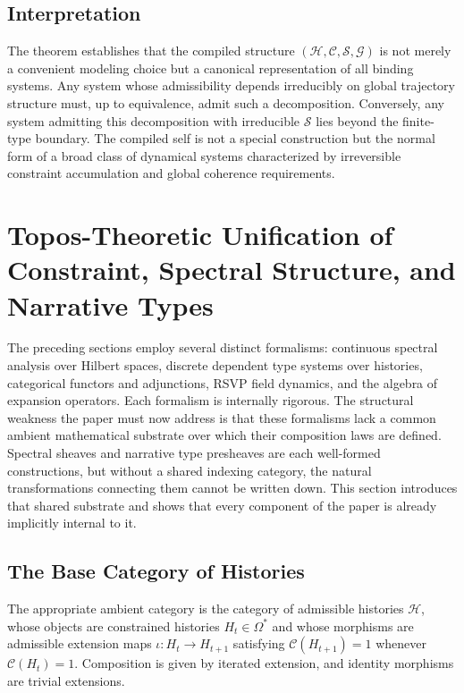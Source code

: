 \documentclass[12pt, a4paper]{article}
\theoremstyle{plain}
\theoremstyle{definition}
\theoremstyle{remark}
\begin{document}
\subsection{Interpretation}

The theorem establishes that the compiled structure $(\mathcal{H}, \mathcal{C}, \mathcal{S}, \mathcal{G})$ is not merely a convenient modeling choice but a canonical representation of all binding systems. Any system whose admissibility depends irreducibly on global trajectory structure must, up to equivalence, admit such a decomposition. Conversely, any system admitting this decomposition with irreducible $\mathcal{S}$ lies beyond the finite-type boundary. The compiled self is not a special construction but the normal form of a broad class of dynamical systems characterized by irreversible constraint accumulation and global coherence requirements.

\section{Topos-Theoretic Unification of Constraint, Spectral Structure, and Narrative Types}

The preceding sections employ several distinct formalisms: continuous spectral analysis over Hilbert spaces, discrete dependent type systems over histories, categorical functors and adjunctions, RSVP field dynamics, and the algebra of expansion operators. Each formalism is internally rigorous. The structural weakness the paper must now address is that these formalisms lack a common ambient mathematical substrate over which their composition laws are defined. Spectral sheaves and narrative type presheaves are each well-formed constructions, but without a shared indexing category, the natural transformations connecting them cannot be written down. This section introduces that shared substrate and shows that every component of the paper is already implicitly internal to it.

\subsection{The Base Category of Histories}

The appropriate ambient category is the category of admissible histories $\mathcal{H}$, whose objects are constrained histories $H_t \in \Omega^*$ and whose morphisms are admissible extension maps $\iota : H_t \to H_{t+1}$ satisfying $\mathcal{C}(H_{t+1}) = 1$ whenever $\mathcal{C}(H_t) = 1$. Composition is given by iterated extension, and identity morphisms are trivial extensions.
\end{document}

